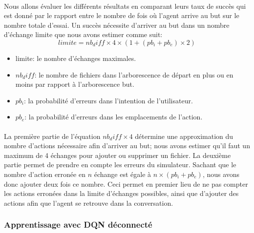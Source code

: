 \paragraph{}Nous allons évaluer les différents résultats en comparant leurs taux de succès qui est donné par le rapport entre le nombre de fois où l'agent arrive au but sur le nombre totale d'essai. Un succès nécessite d'arriver au but dans un nombre d'échange limite que nous avons estimer comme suit: 
\[limite = nb_diff \times 4 \times (1 + (pb_i + pb_e) \times 2) \]
\begin{itemize}
	\item limite: le nombre d'échanges maximales.
	\item $nb_diff$: le nombre de fichiers dans l'arborescence de départ en plus ou en moins par rapport à l'arborescence but.
	\item $pb_i$: la probabilité d'erreurs dans l'intention de l'utilisateur.
	\item $pb_e$: la probabilité d'erreurs dans les emplacements de l'action.
\end{itemize}
\paragraph{}La première partie de l'équation $nb_diff \times 4$ détermine une approximation du nombre d'actions nécessaire afin d'arriver au but; nous avons estimer qu'il faut un maximum de 4 échanges pour ajouter ou supprimer un fichier. La deuxième partie permet de prendre en compte les erreurs du simulateur. Sachant que le nombre d'action erronée en $n$ échange est égale à $n \times (pb_i + pb_e)$, nous avons donc ajouter deux fois ce nombre. Ceci permet en premier lieu de ne pas compter les actions erronées dans la limite d'échanges possibles, ainsi que d'ajouter des actions afin que l'agent se retrouve dans la conversation.
\subsubsection{Apprentissage avec DQN déconnecté}
